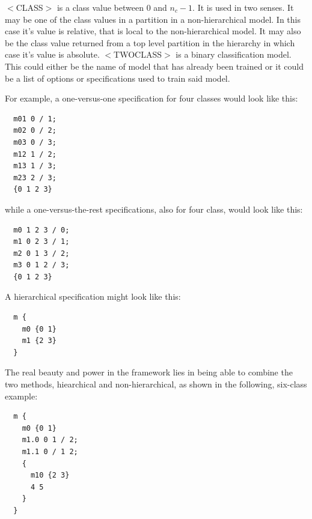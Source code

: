 \documentclass{article}
\begin{document}
$<$CLASS$>$ is a class value between 0 and $n_c-1$.  It is used in two senses.
It may be one of the class values in a partition in a non-hierarchical model.
In this case it's value is relative, that is local to the non-hierarchical model.
It may also be the class value returned
from a top level partition in the hierarchy in which case it's value is absolute.
$<$TWOCLASS$>$ is a binary classification model.
This could either be the name of model that has already been trained or it
could be a list of options or specifications used to train said model.

For example, a one-versus-one specification for four classes would look like
this:

\begin{verbatim}
  m01 0 / 1;
  m02 0 / 2;
  m03 0 / 3;
  m12 1 / 2;
  m13 1 / 3;
  m23 2 / 3;
  {0 1 2 3}
\end{verbatim}

while a one-versus-the-rest specifications, also for four class, would look
like this:

\begin{verbatim}
  m0 1 2 3 / 0;
  m1 0 2 3 / 1;
  m2 0 1 3 / 2;
  m3 0 1 2 / 3;
  {0 1 2 3}
\end{verbatim}

A hierarchical specification might look like this:

\begin{verbatim}
  m {
    m0 {0 1}
    m1 {2 3}
  }
\end{verbatim}

The real beauty and power in the framework lies in being able to combine the
two methods, hiearchical and non-hierarchical, as shown in the following,
six-class example:

\begin{verbatim}
  m {
    m0 {0 1}
    m1.0 0 1 / 2;
    m1.1 0 / 1 2;
    {
      m10 {2 3}
      4 5
    }
  }
\end{verbatim}


\end{document}
